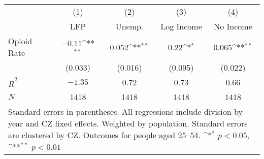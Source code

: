 {
\def\sym#1{\ifmmode^{#1}\else\(^{#1}\)\fi}
\begin{tabular}{l*{4}{c}}
\hline\hline
            &\multicolumn{1}{c}{(1)}&\multicolumn{1}{c}{(2)}&\multicolumn{1}{c}{(3)}&\multicolumn{1}{c}{(4)}\\
            &\multicolumn{1}{c}{LFP}&\multicolumn{1}{c}{Unemp.}&\multicolumn{1}{c}{Log Income}&\multicolumn{1}{c}{No Income}\\
\hline
Opioid Rate &       $-0.11$\sym{**}&       0.052\sym{**}&        0.22\sym{*} &       0.065\sym{**}\\
            &     (0.033)        &     (0.016)        &     (0.095)        &     (0.022)        \\
\hline
$\bar{R}^2$ &       $-1.35$        &        0.72        &        0.73        &        0.66        \\
$N$         &        1418        &        1418        &        1418        &        1418        \\
\hline\hline
\multicolumn{5}{p{0.55\linewidth}}{\footnotesize Standard errors in parentheses.  All regressions include division-by-year and CZ fixed effects. Weighted by population.  Standard errors are clustered by CZ.  Outcomes for people aged 25--54.  \sym{*} \(p<0.05\), \sym{**} \(p<0.01\)}\\
\end{tabular}
}

